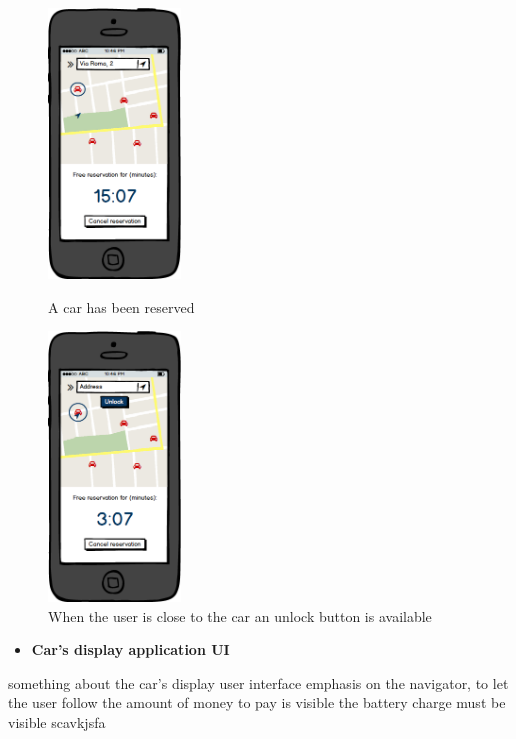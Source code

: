 \documentclass[english]{article}
\begin{document}
\begin{figure}[H]
	\centering
	\begin{minipage}{.55\textwidth}
	\centering
	\includegraphics[width=100pt]{mobile/FreeReservation.png}
	\caption{A car has been reserved}
	\end{minipage}%
	\begin{minipage}{.5\textwidth}
	\centering
	\includegraphics[width=100pt]{mobile/Unlock.png}
	\caption{When the user is close to the car an unlock button is available}
	\end{minipage}
\end{figure}


\newpage
\begin{itemize}
	\item{\textbf{Car's display application UI}}
\end{itemize}

something about the car's display user interface
emphasis on the navigator, to let the user follow 
the amount of money to pay is visible
the battery charge must be visible
scavkjsfa
\end{document}
